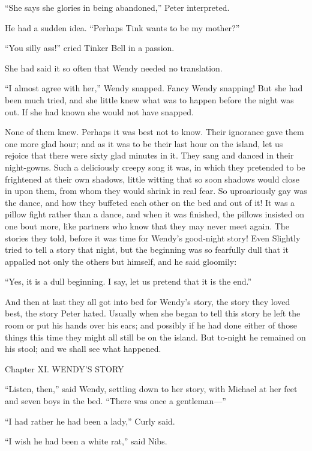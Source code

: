 ``She says she glories in being abandoned,'' Peter interpreted.

He had a sudden idea. ``Perhaps Tink wants to be my mother?''

``You silly ass!'' cried Tinker Bell in a passion.

She had said it so often that Wendy needed no translation.

``I almost agree with her,'' Wendy snapped. Fancy Wendy snapping! But she
had been much tried, and she little knew what was to happen before the
night was out. If she had known she would not have snapped.

None of them knew. Perhaps it was best not to know. Their ignorance
gave them one more glad hour; and as it was to be their last hour on
the island, let us rejoice that there were sixty glad minutes in it.
They sang and danced in their night-gowns. Such a deliciously creepy
song it was, in which they pretended to be frightened at their own
shadows, little witting that so soon shadows would close in upon them,
from whom they would shrink in real fear. So uproariously gay was the
dance, and how they buffeted each other on the bed and out of it! It
was a pillow fight rather than a dance, and when it was finished, the
pillows insisted on one bout more, like partners who know that they may
never meet again. The stories they told, before it was time for Wendy's
good-night story! Even Slightly tried to tell a story that night, but
the beginning was so fearfully dull that it appalled not only the
others but himself, and he said gloomily:

``Yes, it is a dull beginning. I say, let us pretend that it is the
end.''

And then at last they all got into bed for Wendy's story, the story
they loved best, the story Peter hated. Usually when she began to tell
this story he left the room or put his hands over his ears; and
possibly if he had done either of those things this time they might all
still be on the island. But to-night he remained on his stool; and we
shall see what happened.




Chapter XI.
WENDY'S STORY


``Listen, then,'' said Wendy, settling down to her story, with Michael at
her feet and seven boys in the bed. ``There was once a gentleman—''

``I had rather he had been a lady,'' Curly said.

``I wish he had been a white rat,'' said Nibs.

